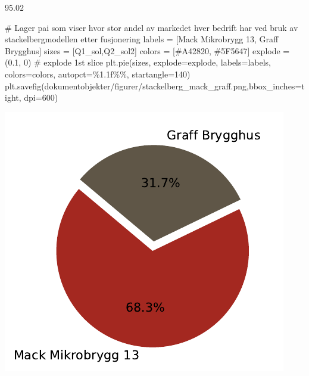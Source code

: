 \documentclass[
  12pt,
  a4paper,
  DIV=11,
  numbers=noendperiod]{scrartcl}
\newenvironment{Shaded}{\begin{snugshade}}{\end{snugshade}}
\newcommand{\CommentTok}[1]{\textcolor[rgb]{0.37,0.37,0.37}{#1}}
\newcommand{\DecValTok}[1]{\textcolor[rgb]{0.68,0.00,0.00}{#1}}
\newcommand{\FloatTok}[1]{\textcolor[rgb]{0.68,0.00,0.00}{#1}}
\newcommand{\NormalTok}[1]{\textcolor[rgb]{0.00,0.23,0.31}{#1}}
\newcommand{\OperatorTok}[1]{\textcolor[rgb]{0.37,0.37,0.37}{#1}}
\newcommand{\SpecialCharTok}[1]{\textcolor[rgb]{0.37,0.37,0.37}{#1}}
\newcommand{\StringTok}[1]{\textcolor[rgb]{0.13,0.47,0.30}{#1}}
\begin{document}
$\displaystyle 95.02$

\begin{Shaded}
\begin{Highlighting}[]
\CommentTok{\# Lager pai som viser hvor stor andel av markedet hver bedrift har ved bruk av stackelbergmodellen etter fusjonering}
\NormalTok{labels }\OperatorTok{=}\NormalTok{ [}\StringTok{\textquotesingle{}Mack Mikrobrygg 13\textquotesingle{}}\NormalTok{, }\StringTok{\textquotesingle{}Graff Brygghus\textquotesingle{}}\NormalTok{]}
\NormalTok{sizes }\OperatorTok{=}\NormalTok{ [Q1\_sol,Q2\_sol2]}
\NormalTok{colors }\OperatorTok{=}\NormalTok{ [}\StringTok{\textquotesingle{}\#A42820\textquotesingle{}}\NormalTok{, }\StringTok{\textquotesingle{}\#5F5647\textquotesingle{}}\NormalTok{]}
\NormalTok{explode }\OperatorTok{=}\NormalTok{ (}\FloatTok{0.1}\NormalTok{, }\DecValTok{0}\NormalTok{)  }\CommentTok{\# explode 1st slice}
\NormalTok{plt.pie(sizes, explode}\OperatorTok{=}\NormalTok{explode, labels}\OperatorTok{=}\NormalTok{labels, colors}\OperatorTok{=}\NormalTok{colors, autopct}\OperatorTok{=}\StringTok{\textquotesingle{}}\SpecialCharTok{\%1.1f\%\%}\StringTok{\textquotesingle{}}\NormalTok{, startangle}\OperatorTok{=}\DecValTok{140}\NormalTok{)}
\NormalTok{plt.savefig(}\StringTok{\textquotesingle{}dokumentobjekter/figurer/stackelberg\_mack\_graff.png\textquotesingle{}}\NormalTok{,bbox\_inches}\OperatorTok{=}\StringTok{\textquotesingle{}tight\textquotesingle{}}\NormalTok{, dpi}\OperatorTok{=}\DecValTok{600}\NormalTok{)}
\end{Highlighting}
\end{Shaded}

\includegraphics{Kandidatnummer_30_mappeoppgave_2_SOK_2030_files/figure-pdf/cell-41-output-1.pdf}
\end{document}
